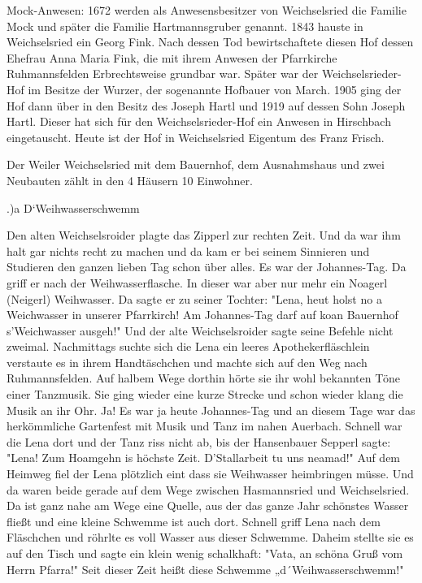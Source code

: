Mock-Anwesen: 1672 werden als Anwesensbesitzer von Weichselsried die Familie
Mock und später die Familie Hartmannsgruber genannt. 1843 hauste in
Weichselsried ein Georg Fink. Nach dessen Tod bewirtschaftete diesen Hof dessen
Ehefrau Anna Maria Fink, die mit ihrem Anwesen der Pfarrkirche Ruhmannsfelden
Erbrechtsweise grundbar war. Später war der Weichselsrieder-Hof im Besitze der
Wurzer, der sogenannte Hofbauer von March. 1905 ging der Hof dann über in den
Besitz des Joseph Hartl und 1919 auf dessen Sohn Joseph Hartl. Dieser hat sich
für den Weichselsrieder-Hof ein Anwesen in Hirschbach eingetauscht. Heute ist
der Hof in Weichselsried Eigentum des Franz Frisch.

Der Weiler Weichselsried mit dem Bauernhof, dem Ausnahmshaus und zwei Neubauten
zählt in den 4 Häusern 10 Einwohner.

.)a D`Weihwasserschwemm

Den alten Weichselsroider plagte das Zipperl zur rechten Zeit. Und da war ihm
halt gar nichts recht zu machen und da kam er bei seinem Sinnieren und Studieren
den ganzen lieben Tag schon über alles. Es war der Johannes-Tag. Da griff er
nach der Weihwasserflasche. In dieser war aber nur mehr ein Noagerl (Neigerl)
Weihwasser. Da sagte er zu seiner Tochter: "Lena, heut holst no a Weichwasser in
unserer Pfarrkirch! Am Johannes-Tag darf auf koan Bauernhof s'Weichwasser
ausgeh!" Und der alte Weichselsroider sagte seine Befehle nicht zweimal.
Nachmittags suchte sich die Lena ein leeres Apothekerfläschlein verstaute es in
ihrem Handtäschchen und machte sich auf den Weg nach Ruhmannsfelden. Auf halbem
Wege dorthin hörte sie ihr wohl bekannten Töne einer Tanzmusik. Sie ging wieder
eine kurze Strecke und schon wieder klang die Musik an ihr Ohr. Ja! Es war ja
heute Johannes-Tag und an diesem Tage war das herkömmliche Gartenfest mit Musik
und Tanz im nahen Auerbach. Schnell war die Lena dort und der Tanz riss nicht
ab, bis der Hansenbauer Sepperl sagte: "Lena! Zum Hoamgehn is höchste Zeit.
D'Stallarbeit tu uns neamad!" Auf dem Heimweg fiel der Lena plötzlich eint dass
sie Weihwasser heimbringen müsse. Und da waren beide gerade auf dem Wege
zwischen Hasmannsried und Weichselsried. Da ist ganz nahe am Wege eine Quelle,
aus der das ganze Jahr schönstes Wasser fließt und eine kleine Schwemme ist auch
dort. Schnell griff Lena nach dem Fläschchen und röhrlte es voll Wasser aus
dieser Schwemme. Daheim stellte sie es auf den Tisch und sagte ein klein wenig
schalkhaft: "Vata, an schöna Gruß vom Herrn Pfarra!" Seit dieser Zeit heißt
diese Schwemme „d´Weihwasserschwemm!"

